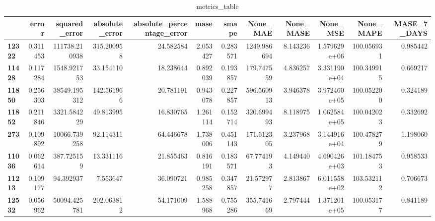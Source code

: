 \begin{table}[h]
\centering
\caption{metrics_table}
\label{table:Final tune for dataset seasonal lstm local multivariate. After smape fix}
\begin{tabular}{lrrrrrrrrrrr}
\toprule
{} &     error &  squared\_error &  absolute\_error &  absolute\_percentage\_error &      mase &     smape &     None\_MAE &  None\_MASE &      None\_MSE &   None\_MAPE &  MASE\_7\_DAYS \\
\midrule
\textbf{12322} &  0.311453 &  111738.210938 &      315.200958 &                  24.582584 &  2.053427 &  0.283571 &  1249.986694 &   8.143236 &  1.579629e+06 &  100.056931 &     0.985442 \\
\textbf{11428} &  0.117284 &    1548.921753 &       33.154110 &                  18.238644 &  0.892039 &  0.193857 &   179.747559 &   4.836257 &  3.331190e+04 &  100.349915 &     0.669217 \\
\textbf{11850} &  0.256303 &   38549.195312 &      142.561966 &                  20.781191 &  0.943078 &  0.227857 &   596.560913 &   3.946378 &  3.972460e+05 &  100.052200 &     0.324189 \\
\textbf{11852} &  0.211846 &    3321.584229 &       49.813995 &                  16.830765 &  1.261114 &  0.152714 &   320.699493 &   8.118975 &  1.062584e+05 &  100.042023 &     0.332692 \\
\textbf{273  } &  0.109892 &   10066.739258 &       92.114311 &                  64.446678 &  1.738006 &  0.451143 &   171.612305 &   3.237968 &  3.144916e+04 &  100.478279 &     1.198060 \\
\textbf{11036} &  0.062614 &     387.725159 &       13.331116 &                  21.855463 &  0.816191 &  0.183571 &    67.774193 &   4.149440 &  4.690426e+03 &  101.184753 &     0.958533 \\
\textbf{11213} &  0.109177 &      94.392937 &        7.553647 &                  36.090721 &  0.985258 &  0.347857 &    21.572977 &   2.813867 &  6.011558e+02 &  103.532112 &     0.706673 \\
\textbf{12532} &  0.056962 &   50094.425781 &      202.063812 &                  54.171009 &  1.588968 &  0.755286 &   355.741669 &   2.797444 &  1.371201e+05 &  100.053177 &     0.841189 \\
\bottomrule
\end{tabular}
\end{table}
